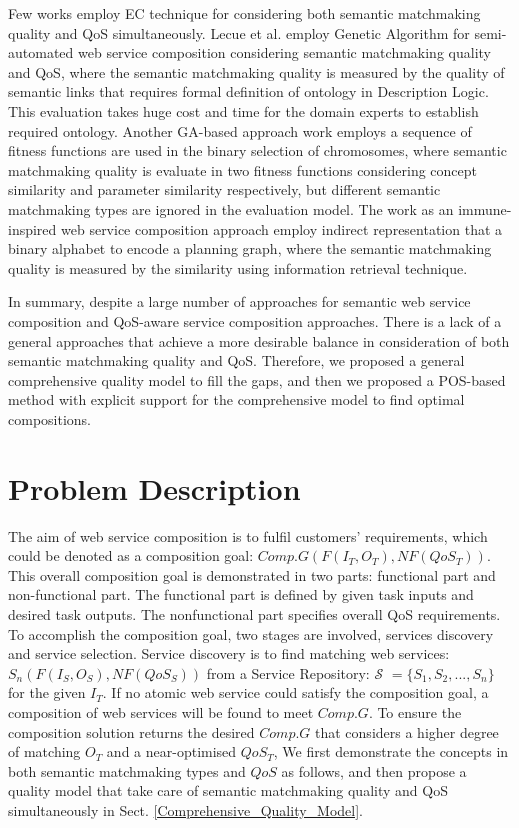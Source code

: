 \documentclass{llncs}
\begin{document}
Few works \cite{fanjiang2014semantic,lecue2009optimizing,pop2009immune} employ EC technique for considering both semantic matchmaking quality and QoS simultaneously. Lecue et al. \cite{lecue2009optimizing} employ Genetic Algorithm for semi-automated web service composition considering semantic matchmaking quality and QoS, where the semantic matchmaking quality is measured by the quality of semantic links that requires formal definition of ontology in Description Logic. This evaluation takes huge cost and time for the domain experts to establish required ontology. Another GA-based approach work \cite{fanjiang2014semantic} employs a sequence of fitness functions are used in the binary selection of chromosomes, where semantic matchmaking quality is evaluate in two fitness functions considering concept similarity and parameter similarity respectively, but different semantic matchmaking types are ignored in the evaluation model. The work \cite{pop2009immune} as an immune-inspired web service composition approach employ indirect representation that a binary alphabet to encode a planning graph, where the semantic matchmaking quality is measured  by the similarity using information retrieval technique.

In summary, despite a large number of approaches for semantic web service composition and QoS-aware service composition approaches. There is a lack of a general approaches that achieve a more desirable balance in consideration of both semantic matchmaking quality and QoS. Therefore, we proposed a general comprehensive quality model to fill the gaps, and then we proposed a POS-based method with explicit support for the comprehensive model to find optimal compositions.

\section{Problem Description}\label{problemDes}

The aim of web service composition is to fulfil customers' requirements, which could be denoted as a composition goal: $Comp.G(F(I_{T}, O_{T}), NF(QoS_{T}))$. This overall composition goal is demonstrated in two parts: functional part and non-functional part. The functional part is defined by given task inputs and desired task outputs. The nonfunctional part specifies overall QoS requirements. To accomplish the composition goal, two stages are involved, services discovery and service selection. Service discovery is to find matching web services: $S_{n}(F(I_{S}, O_{S}), NF(QoS_{S}))$ from a Service Repository: $\mathcal{S}$ $=  \{S_{1}, S_{2},..., S_{n} \}$ for the given $I_{T}$. If no atomic web service could satisfy the composition goal, a composition of web services will be found to meet $Comp.G$. To ensure the composition solution returns the desired $Comp.G$ that considers a higher degree of matching $O_{T}$ and a near-optimised $QoS_{T}$, We first demonstrate the concepts in both semantic matchmaking types and $QoS$ as follows, and then propose a quality model that take care of semantic matchmaking quality and QoS simultaneously in Sect. \ref{Comprehensive_Quality_Model}.
\end{document}
